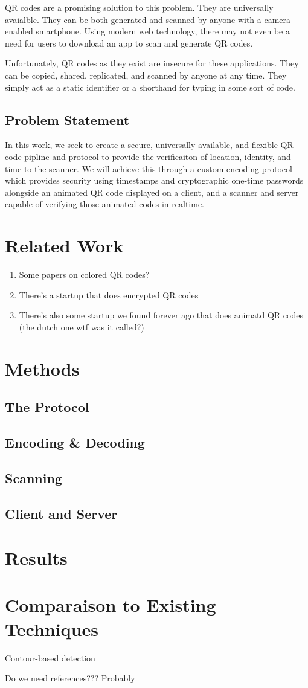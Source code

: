 \documentclass[10pt,twocolumn,letterpaper]{article}
\begin{document}
QR codes are a promising solution to this problem. They are universally avaialble. They can be both generated and scanned by anyone with a camera-enabled smartphone. Using modern web technology, there may not even be a need for users to download an app to scan and generate QR codes.

Unfortunately, QR codes as they exist are insecure for these applications. They can be copied, shared, replicated, and scanned by anyone at any time. They simply act as a static identifier or a shorthand for typing in some sort of code.

\subsection{Problem Statement}
In this work, we seek to create a secure, universally available, and flexible QR code pipline and protocol to provide the verificaiton of location, identity, and time to the scanner. We will achieve this through a custom encoding protocol which provides security using timestamps and cryptographic one-time passwords alongside an animated QR code displayed on a client, and a scanner and server capable of verifying those animated codes in realtime.

\section{Related Work}
\begin{enumerate}
   \item Some papers on colored QR codes?
   \item There's a startup that does encrypted QR codes
   \item There's also some startup we found forever ago that does animatd QR codes (the dutch one wtf was it called?)
\end{enumerate}

\section{Methods}

\subsection{The Protocol}

\subsection{Encoding \& Decoding}

\subsection{Scanning}

\subsection{Client and Server}

\section{Results}

\section{Comparaison to Existing Techniques}
Contour-based detection

Do we need references??? Probably
\end{document}
